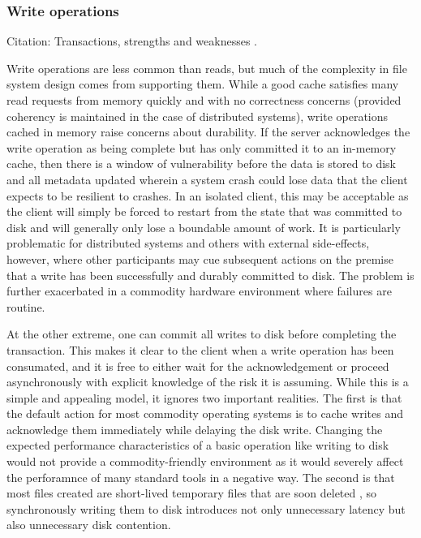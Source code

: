 \subsubsection{Write operations}\label{sec:data-paths-write}

Citation: Transactions, strengths and weaknesses \cite{gray81}.

Write operations are less common than reads, but much of the complexity in file system design comes from supporting them. While a good cache satisfies many read requests from memory quickly and with no correctness concerns (provided coherency is maintained in the case of distributed systems), write operations cached in memory raise concerns about durability. If the server acknowledges the write operation as being complete but has only committed it to an in-memory cache, then there is a window of vulnerability before the data is stored to disk and all metadata updated wherein a system crash could lose data that the client expects to be resilient to crashes. In an isolated client, this may be acceptable as the client will simply be forced to restart from the state that was committed to disk and will generally only lose a boundable amount of work. It is particularly problematic for distributed systems and others with external side-effects, however, where other participants may cue subsequent actions on the premise that a write has been successfully and durably committed to disk. The problem is further exacerbated in a commodity hardware environment where failures are routine.

At the other extreme, one can commit all writes to disk before completing the transaction. This makes it clear to the client when a write operation has been consumated, and it is free to either wait for the acknowledgement or proceed asynchronously with explicit knowledge of the risk it is assuming. While this is a simple and appealing model, it ignores two important realities. The first is that the default action for most commodity operating systems is to cache writes and acknowledge them immediately while delaying the disk write. Changing the expected performance characteristics of a basic operation like writing to disk would not provide a commodity-friendly environment as it would severely affect the perforamnce of many standard tools in a negative way. The second is that most files created are short-lived temporary files that are soon deleted \cite{ousterhout}, so synchronously writing them to disk introduces not only unnecessary latency but also unnecessary disk contention.

